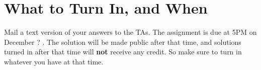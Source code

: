 \section{What to Turn In, and When}

Mail a text version of your answers to the TAs.
The assignment is due at 5PM on December ? .  The solution will be made
public after that time,  and solutions turned  in after that time will
{\bf not} receive any credit.   So make sure to  turn in whatever  you
have at that time.





